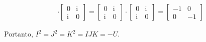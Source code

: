 \documentclass[12pt,a4paper]{article}
\newcommand\ii{\mathrm{i}}
\begin{document}
\begin{enumerate}
\begin{enumerate}
\begin{align*}
\cdot \begin{bmatrix} 0 & \ii \\ \ii & 0 \end{bmatrix}
=     \begin{bmatrix} 0 & \ii \\ \ii & 0 \end{bmatrix}
\cdot \begin{bmatrix} 0 & \ii \\ \ii & 0 \end{bmatrix}
= \begin{bmatrix} -1 & 0 \\ 0 & -1 \end{bmatrix}
\end{align*}

Portanto, $I^2 = J^2 = K^2 = I J K = -U$.



\end{enumerate}
\end{enumerate}
\end{document}
